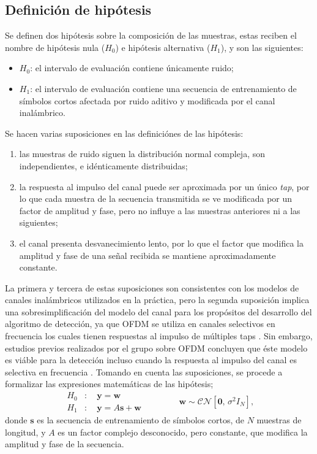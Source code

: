 \subsection{Definición de hipótesis}
\label{Ss:def-hipotesis}

Se definen dos hipótesis sobre la composición de las muestras, estas reciben el nombre de hipótesis nula ($H_0$) e hipótesis alternativa ($H_1$), y son las siguientes:
\begin{itemize}
    \item $H_0$: el intervalo de evaluación contiene únicamente ruido;
    \item $H_1$: el intervalo de evaluación contiene una secuencia de entrenamiento de símbolos cortos afectada por ruido aditivo y modificada por el canal inalámbrico.
\end{itemize}

Se hacen varias suposiciones en las definiciónes de las hipótesis:
\begin{enumerate}
    \item las muestras de ruido siguen la distribución normal compleja, son independientes, e idénticamente distribuidas;
    \item la respuesta al impulso del canal puede ser aproximada por un único \textit{tap}, por lo que cada muestra de la secuencia transmitida se ve modificada por un factor de amplitud y fase, pero no influye a las muestras anteriores ni a las siguientes;
    \item el canal presenta desvanecimiento lento, por lo que el factor que modifica la amplitud y fase de una señal recibida se mantiene aproximadamente constante.
\end{enumerate}
\color{Green}
La primera y tercera de estas suposiciones son consistentes con los modelos de canales inalámbricos utilizados en la práctica, pero la segunda suposición implica una sobresimplificación del modelo del canal para los propósitos del desarrollo del algoritmo de detección, ya que OFDM se utiliza en canales selectivos en frecuencia los cuales tienen respuestas al impulso de múltiples taps \cite{tse}. Sin embargo, estudios previos realizados por el grupo sobre OFDM concluyen que éste modelo es viáble para la detección incluso cuando la respuesta al impulso del canal es selectiva en frecuencia \cite{tesis-daniel}. \color{black} Tomando en cuenta las suposiciones, se procede a formalizar las expresiones matemáticas de las hipótesis;
\begin{equation}\label{eq:def-hipótesis}
    \begin{aligned}
        H_0&: \quad \mathbf{y} = \mathbf{w}\\
        H_1&: \quad \mathbf{y} = A\mathbf{s} + \mathbf{w}
    \end{aligned}
    \qquad\qquad
    \mathbf{w} \sim \mathcal{CN}\left[\mathbf{0},\, \sigma^2 I_N\right],
\end{equation}
donde $\mathbf{s}$ es la secuencia de entrenamiento de símbolos cortos, de $N$ muestras de longitud, y $A$ es un factor complejo desconocido, pero constante, que modifica la amplitud y fase de la secuencia. 

